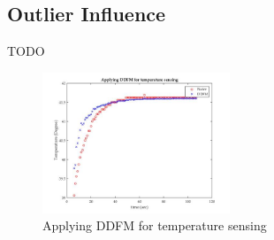 \documentclass[journal]{IEEEtran}
\begin{document}
\subsection{Outlier Influence}
TODO

%
%
\begin{figure}[!t]
    \centering
        \includegraphics[width=0.5\textwidth]{fig1_appDDFM.jpg}
    \caption{Applying DDFM for temperature sensing}
    \label{fig:appDDFM}
\end{figure}
\end{document}
